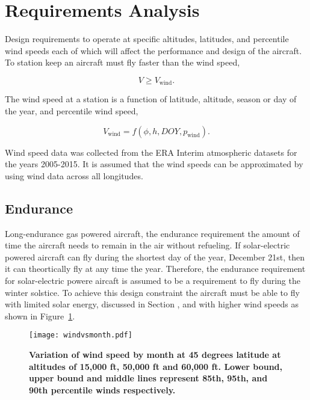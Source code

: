 \documentclass[]{aiaa-tc}%
\begin{document}
\section{Requirements Analysis}

Design requirements to operate at specific altitudes, latitudes, and percentile wind speeds each of which will affect the performance and design of the aircraft.\cite{zephyr} 
To station keep an aircraft must fly faster than the wind speed,

\begin{equation}
    \label{e:availreq}
    V \geq V_{\text{wind}}.
\end{equation}

The wind speed at a station is a function of latitude, altitude, season or day of the year, and percentile wind speed,

\begin{equation}
    \label{e:windspeed}
    V_{\text{wind}} = f(\phi, h, DOY, p_{\text{wind}}).
    \end{equation}

Wind speed data was collected from the ERA Interim atmospheric datasets for the years 2005-2015.\cite{wind} 
It is assumed that the wind speeds can be approximated by using wind data across all longitudes. 

\subsection{Endurance}

Long-endurance gas powered aircraft, the endurance requirement the amount of time the aircraft needs to remain in the air without refueling.  
If solar-electric powered aircraft can fly during the shortest day of the year, December 21st, then it can theortically fly at any time the year.  
Therefore, the endurance requirement for solar-electric powere aircaft is assumed to be a requirement to fly during the winter solstice.  
To achieve this design constraint the aircraft must be able to fly with limited solar energy, discussed in Section , and with higher wind speeds as shown in Figure~\ref{f:windvsmonth}.

\begin{figure}[H]
	\begin{center}
	\texttt{[image: windvsmonth.pdf]}
    \caption{\textbf{Variation of wind speed by month at 45 degrees latitude at altitudes of 15,000 ft, 50,000 ft and 60,000 ft.  Lower bound, upper bound and middle lines represent 85th, 95th, and 90th percentile winds respectively.}}
	\label{f:windvsmonth}
	\end{center}
\end{figure}
\end{document}
